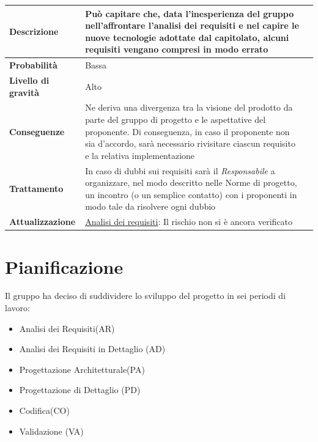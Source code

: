 \begin{center}
	
	\begin{tabular}{|>{\centering}m{4cm} ||>{\centering}m{8cm} |>{\centering\arraybackslash}m{0pt}@{}|}
		\hline
		\textbf{Descrizione} & Può capitare che, data l’inesperienza del gruppo nell’affrontare l’analisi dei requisiti e nel capire le nuove tecnologie adottate dal capitolato, alcuni requisiti vengano compresi in modo errato & \\[2ex]
		\hline	
		\textbf{Probabilità} & Bassa & \\[1ex]
		\hline
		\textbf{Livello di gravità} & Alto & \\[1ex]
		\hline
		\textbf{Conseguenze} & Ne deriva una divergenza tra la visione
		del prodotto da parte del gruppo di progetto e le aspettative del
		proponente. Di conseguenza, in caso il proponente non sia d’accordo,
		sarà necessario rivisitare ciascun requisito e la relativa
		implementazione & \\[1ex]
		\hline
		\textbf{Trattamento} & In caso di dubbi sui requisiti sarà il  \emph{Responsabile}  a organizzare, nel modo descritto nelle Norme di progetto, un incontro (o un semplice contatto) con i proponenti in modo tale da risolvere ogni dubbio & \\[1ex] 
		\hline
		\textbf{Attualizzazione} & \underline{Analisi dei requisiti}: Il rischio non si è ancora verificato & \\[1ex]
		\hline
	\end{tabular}
	
\end{center}


\section{Pianificazione}
Il gruppo ha deciso di suddividere lo sviluppo del progetto in sei periodi di lavoro:

\begin{itemize}
\item Analisi dei Requisiti(AR)
\item Analisi dei Requisiti in Dettaglio (AD)
\item Progettazione Architetturale(PA)
\item Progettazione di Dettaglio (PD)
\item Codifica(CO)
\item Validazione (VA)
\end{itemize}

